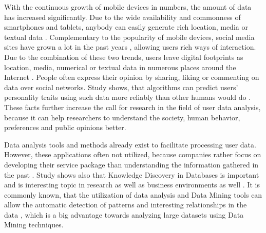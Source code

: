     With the continuous growth of mobile devices in numbers, the amount of data has increased significantly. Due to the wide availability and commonness of smartphones and tablets, anybody can easily generate rich location, media or textual data \cite{jang2016teensengagemorewithfewerphotos}. Complementary to the popularity of mobile devices, social media sites have grown a lot in the past years \cite{hu2014we, ottoni2013ladies, bakhshi2014faces}, allowing users rich ways of interaction. Due to the combination of these two trends, users leave digital footprints as location, media, numerical or textual data in numerous places around the Internet \cite{youyou2015computer}. People often express their opinion by sharing, liking or commenting on data over social networks. Study shows, that algorithms can predict users' personality traits using such data more reliably than other humans would do \cite{youyou2015computer}. These facts further increase the call for research in the field of user data analysis, because it can help researchers to understand the society, human behavior, preferences and public opinions better.

    Data analysis tools and methods already exist to facilitate processing user data. However, these applications often not utilized, because companies rather focus on developing their service package than understanding the information gathered in the past \cite{bigdatamanagementrevolution, inmon2007tapping}. Study shows also that Knowledge Discovery in Databases is important and is interesting topic in research as well as business environments as well \cite{bigdatamanagementrevolution, zarsky2002mine}. It is commonly known, that the utilization of data analysis and Data Mining tools can allow the automatic detection of patterns and interesting relationships in the data \cite{introtodatamining, Friedman97datamining}, which is a big advantage towards analyzing large datasets using Data Mining techniques. 
    
